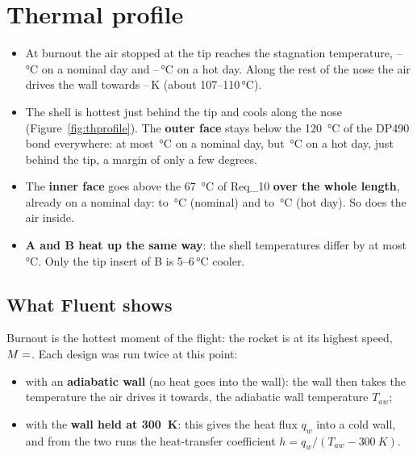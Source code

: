 \section{Thermal profile}
\label{sec:heating}

\begin{keybox}
\begin{itemize}
\item At burnout the air stopped at the tip reaches the stagnation temperature,
--\,\si{\celsius} on a nominal day and
--\,\si{\celsius} on a hot day. Along the
rest of the nose the air drives the wall towards --\,K (about
107--110\,\si{\celsius}).
\item The shell is hottest just behind the tip and cools along the nose
(Figure~\ref{fig:thprofile}). The \textbf{outer face} stays below the \SI{120}{\celsius} of the DP490
bond everywhere: at most \,\si{\celsius} on a nominal day, but
\,\si{\celsius} on a hot day, just behind the tip, a margin of only a few degrees.
\item The \textbf{inner face} goes above the \SI{67}{\celsius} of Req\_10 \textbf{over the whole length},
already on a nominal day:  to \,\si{\celsius} (nominal)
and  to \,\si{\celsius} (hot day). So does the air inside.
\item \textbf{A and B heat up the same way}: the shell temperatures differ by at most
\,\si{\celsius}. Only the tip insert of B is 5--6\,\si{\celsius} cooler.
\end{itemize}
\end{keybox}

\subsection{What Fluent shows}

Burnout is the hottest moment of the flight: the rocket is at its highest speed, $M = \val{pt-M147-M}$.
Each design was run twice at this point:
\begin{itemize}
\item with an \textbf{adiabatic wall} (no heat goes into the wall): the wall then takes the temperature the
air drives it towards, the adiabatic wall temperature $T_{aw}$;
\item with the \textbf{wall held at \SI{300}{K}}: this gives the heat flux $q_w$ into a cold wall, and
from the two runs the heat-transfer coefficient $h = q_w/(T_{aw} - \SI{300}{K})$.
\end{itemize}

